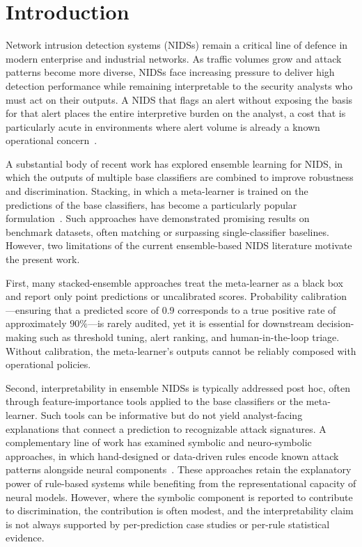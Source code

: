 \documentclass[pdflatex,sn-mathphys-num]{sn-jnl}
\theoremstyle{thmstyleone}
\theoremstyle{thmstyletwo}
\theoremstyle{thmstylethree}
\begin{document}
\maketitle

\section{Introduction}\label{sec:intro}

Network intrusion detection systems (NIDSs) remain a critical line of defence in modern enterprise and industrial networks. As traffic volumes grow and attack patterns become more diverse, NIDSs face increasing pressure to deliver high detection performance while remaining interpretable to the security analysts who must act on their outputs. A NIDS that flags an alert without exposing the basis for that alert places the entire interpretive burden on the analyst, a cost that is particularly acute in environments where alert volume is already a known operational concern~\cite{shone2017deep,gurung2019deep}.

A substantial body of recent work has explored ensemble learning for NIDS, in which the outputs of multiple base classifiers are combined to improve robustness and discrimination. Stacking, in which a meta-learner is trained on the predictions of the base classifiers, has become a particularly popular formulation~\cite{infuse2023,eed2024,ji2025stacked}. Such approaches have demonstrated promising results on benchmark datasets, often matching or surpassing single-classifier baselines. However, two limitations of the current ensemble-based NIDS literature motivate the present work.

First, many stacked-ensemble approaches treat the meta-learner as a black box and report only point predictions or uncalibrated scores. Probability calibration---ensuring that a predicted score of $0.9$ corresponds to a true positive rate of approximately $90\%$---is rarely audited, yet it is essential for downstream decision-making such as threshold tuning, alert ranking, and human-in-the-loop triage. Without calibration, the meta-learner's outputs cannot be reliably composed with operational policies.

Second, interpretability in ensemble NIDSs is typically addressed post hoc, often through feature-importance tools applied to the base classifiers or the meta-learner. Such tools can be informative but do not yield analyst-facing explanations that connect a prediction to recognizable attack signatures. A complementary line of work has examined symbolic and neuro-symbolic approaches, in which hand-designed or data-driven rules encode known attack patterns alongside neural components~\cite{neurosymbolic2025iot,neurosymbolic2026sensors}. These approaches retain the explanatory power of rule-based systems while benefiting from the representational capacity of neural models. However, where the symbolic component is reported to contribute to discrimination, the contribution is often modest, and the interpretability claim is not always supported by per-prediction case studies or per-rule statistical evidence.
\end{document}
